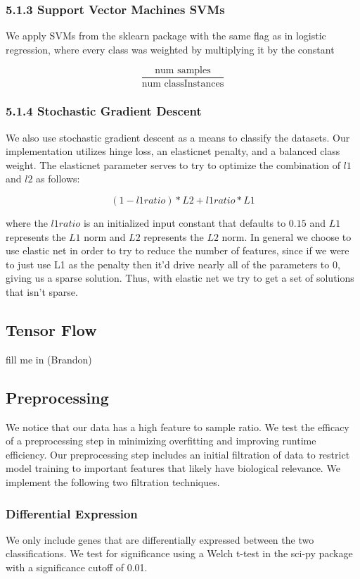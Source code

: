\documentclass[12pt]{scrartcl}
\begin{document}
    \subsubsection*{5.1.3 Support Vector Machines SVMs}
    We apply SVMs from the sklearn package with the same flag as in logistic regression, where every class was weighted by multiplying it by the constant
    
    $$\frac{\textrm{num samples}}{\textrm{num classInstances}}$$
    
    \subsubsection*{5.1.4 Stochastic Gradient Descent}
    We also use stochastic gradient descent as a means to classify the datasets. Our implementation utilizes hinge loss, an elasticnet penalty, and a balanced class weight. The elasticnet parameter serves to try to optimize the combination of $l1$ and $l2$ as follows:
    
    $$(1-l1ratio)*L2 +l1ratio*L1$$
    
    where the $l1ratio$ is an initialized input constant that defaults to $0.15$ and $L1$ represents the $L1$ norm and $L2$ represents the $L2$ norm. In general we choose to use elastic net in order to try to reduce the number of features, since if we were to just use L1 as the penalty then it'd drive nearly all of the parameters to $0$, giving us a sparse solution. Thus, with elastic net we try to get a set of solutions that isn't sparse.
    
    \subsection{Tensor Flow}
    fill me in (Brandon)

    \subsection{Preprocessing}
We notice that our data has a high feature to sample ratio. We test the efficacy of a preprocessing step in minimizing overfitting and improving runtime efficiency. Our preprocessing step includes an initial filtration of data to restrict model training to important features that likely have biological relevance. We implement the following two filtration techniques.

    \subsubsection{Differential Expression}
We only include genes that are differentially expressed between the two classifications. We test for significance using a Welch t-test in the sci-py package with a significance cutoff of 0.01. 
\end{document}
